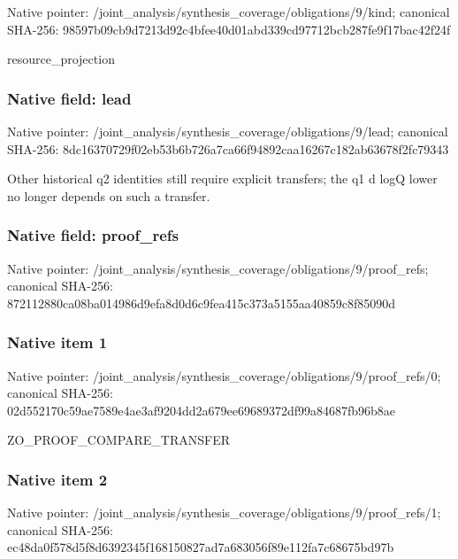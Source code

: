 \documentclass[10pt,a4paper]{article}
\begin{document}
Native pointer: /joint\_analysis/synthesi\allowbreak{}s\_coverage/obligations/9\allowbreak{}/kind; canonical SHA-256: 98597b09cb9d7213d92c4bfe\allowbreak{}e40d01abd339cd97712bcb28\allowbreak{}7fe9f17bac42f24f


resource\_projection


\subsubsection{Native field: lead}


Native pointer: /joint\_analysis/synthesi\allowbreak{}s\_coverage/obligations/9\allowbreak{}/lead; canonical SHA-256: 8dc16370729f02eb53b6b726\allowbreak{}a7ca66f94892caa16267c182\allowbreak{}ab63678f2fc79343


Other historical q2 identities still require explicit transfers; the q1 d logQ lower no longer depends on such a transfer.


\subsubsection{Native field: proof\_refs}


Native pointer: /joint\_analysis/synthesi\allowbreak{}s\_coverage/obligations/9\allowbreak{}/proof\_refs; canonical SHA-256: 872112880ca08ba014986d9e\allowbreak{}fa8d0d6c9fea415c373a5155\allowbreak{}aa40859c8f85090d



\subsubsection{Native item 1}


Native pointer: /joint\_analysis/synthesi\allowbreak{}s\_coverage/obligations/9\allowbreak{}/proof\_refs/0; canonical SHA-256: 02d552170c59ae7589e4ae3a\allowbreak{}f9204dd2a679ee69689372df\allowbreak{}99a84687fb96b8ae


ZO\_PROOF\_COMPARE\_TRANSFER


\subsubsection{Native item 2}


Native pointer: /joint\_analysis/synthesi\allowbreak{}s\_coverage/obligations/9\allowbreak{}/proof\_refs/1; canonical SHA-256: ec48da0f578d5f8d6392345f\allowbreak{}168150827ad7a683056f89e1\allowbreak{}12fa7c68675bd97b
\end{document}
